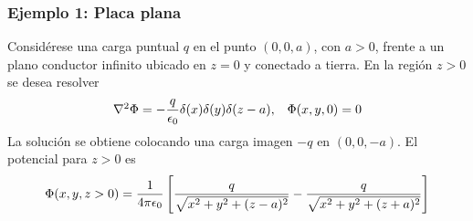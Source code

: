 \documentclass[]{article}
\numberwithin{equation}{section}
\begin{document}
\subsubsection{Ejemplo 1: Placa plana}
Considérese una carga puntual \(q\) en el punto \((0, 0, a)\), con \(a > 0\), frente a un plano conductor infinito ubicado en \(z = 0\) y conectado a tierra. En la región \(z > 0\) se desea resolver
\begin{equation*}
	\begin{matrix}
		\nabla^2\Phi = -\dfrac{q}{\epsilon_{0}}\delta(x)\delta(y)\delta(z-a),& \Phi(x,y,0) = 0
	\end{matrix}
\end{equation*}
La solución se obtiene colocando una carga imagen \(-q\) en \((0, 0, -a)\). El potencial para \(z > 0\) es
\begin{equation*}
	\Phi(x,y,z>0) = \ke\left[\frac{q}{\sqrt{x^2+y^2+(z-a)^2}} - \frac{q}{\sqrt{x^2+y^2+(z+a)^2}} \right] 
\end{equation*}
\end{document}
